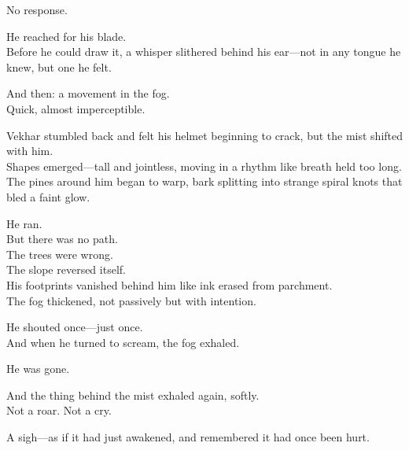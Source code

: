 \documentclass[12pt]{article}
\begin{document}
No response.

\vspace{1em}

He reached for his blade.\\
Before he could draw it, a whisper slithered behind his ear—not in any tongue he knew, but one he felt.

\vspace{1em}

And then: a movement in the fog.\\
Quick, almost imperceptible.\\

\vspace{1em}

Vekhar stumbled back and felt his helmet beginning to crack, but the mist shifted with him.\\
Shapes emerged—tall and jointless, moving in a rhythm like breath held too long.\\
The pines around him began to warp, bark splitting into strange spiral knots that bled a faint glow.

\vspace{1em}

He ran.\\
But there was no path.\\
The trees were wrong.\\
The slope reversed itself.\\
His footprints vanished behind him like ink erased from parchment.\\
The fog thickened, not passively but with intention.

\vspace{1em}

He shouted once—just once.\\
And when he turned to scream, the fog exhaled.

\vspace{1em}

He was gone.

\vspace{1em}

And the thing behind the mist exhaled again, softly.\\
Not a roar. Not a cry.

\vspace{1em}

A sigh—as if it had just awakened, and remembered it had once been hurt.

\vspace{1em}
\end{document}
